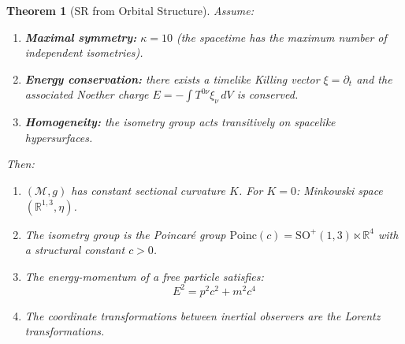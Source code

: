 \documentclass[11pt,twocolumn]{article}
\theoremstyle{plain}\newtheorem{theorem}{Theorem}\newtheorem{proposition}[theorem]{Proposition}\newtheorem{corollary}[theorem]{Corollary}\newtheorem{lemma}[theorem]{Lemma}
\theoremstyle{definition}\newtheorem{definition}[theorem]{Definition}
\theoremstyle{remark}\newtheorem{remark}[theorem]{Remark}
\newcommand{\Poinc}{\mathrm{Poinc}}
\begin{document}
\begin{theorem}[SR from Orbital Structure]\label{thm:SR}
Assume:
\begin{enumerate}[label=(S\arabic*)]
    \item \textbf{Maximal symmetry:} $\kappa = 10$ (the spacetime has the maximum number of independent isometries).
    \item \textbf{Energy conservation:} there exists a timelike Killing vector $\xi = \partial_t$ and the associated Noether charge $E = -\int T^{0\nu}\xi_\nu\,dV$ is conserved.
    \item \textbf{Homogeneity:} the isometry group acts transitively on spacelike hypersurfaces.
\end{enumerate}
Then:
\begin{enumerate}[label=(\alph*)]
    \item $(\mathcal{M}, g)$ has constant sectional curvature $K$. For $K = 0$: Minkowski space $(\mathbb{R}^{1,3}, \eta)$.
    \item The isometry group is the Poincar\'e group $\Poinc(c) = \mathrm{SO}^+(1,3) \ltimes \mathbb{R}^4$ with a structural constant $c > 0$.
    \item The energy-momentum of a free particle satisfies:
    \begin{equation}
    \boxed{E^2 = p^2c^2 + m^2c^4}
    \end{equation}
    \item The coordinate transformations between inertial observers are the Lorentz transformations.
\end{enumerate}
\end{theorem}
\end{document}

